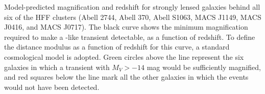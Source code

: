 \label{fig:StronglyLensedGalaxies}
Model-predicted magnification and redshift for strongly lensed
galaxies behind all six of the HFF clusters (Abell 2744, Abell 370,
Abell S1063, MACS J1149, MACS J0416, and MACS J0717).  The black curve
shows the minimum magnification required to make a \spock-like
transient detectable, as a function of redshift. To define the
distance modulus as a function of redshift for this curve, a
standard \LCDM cosmological model is adopted\cite{Planck:2016}.  Green
circles above the line represent the six galaxies in which a transient
with $M_{V}>-14$ mag would be sufficiently magnified, and red squares
below the line mark all the other galaxies in which the \spock events
would not have been detected.
